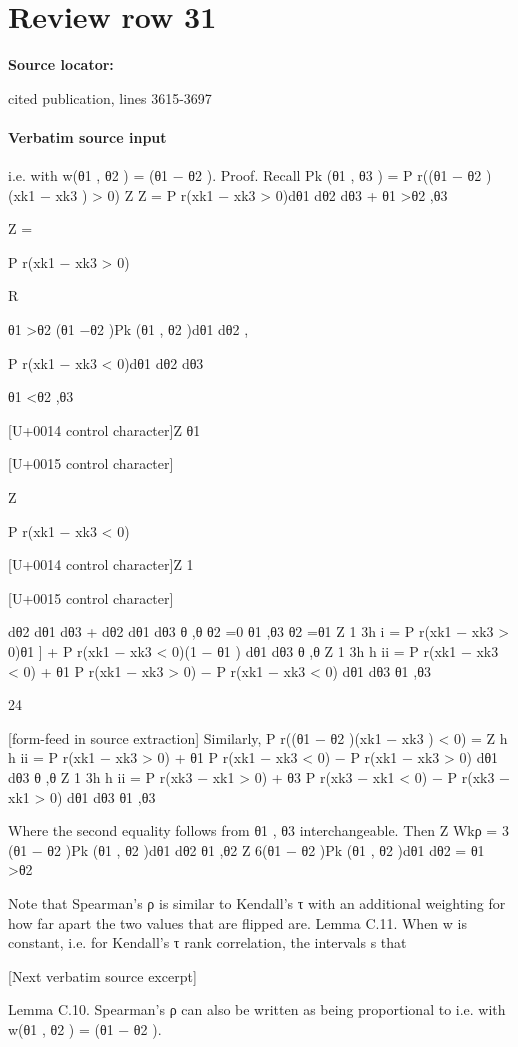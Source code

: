 \documentclass[10pt]{article}
\begin{document}
\section*{Review row 31}
\textbf{Source locator:} {\footnotesize\raggedright cited publication, lines 3615-\allowbreak{}3697\par}
\paragraph{Verbatim source input}
\begin{ReviewVerbatim}
i.e. with w(θ1 , θ2 ) = (θ1 − θ2 ).
Proof. Recall Pk (θ1 , θ3 ) =
P r((θ1 − θ2 )(xk1 − xk3 ) > 0)
Z
Z
=
P r(xk1 − xk3 > 0)dθ1 dθ2 dθ3 +
θ1 >θ2 ,θ3

Z
=

P r(xk1 − xk3 > 0)

R

θ1 >θ2 (θ1 −θ2 )Pk (θ1 , θ2 )dθ1 dθ2 ,

P r(xk1 − xk3 < 0)dθ1 dθ2 dθ3

θ1 <θ2 ,θ3

[U+0014 control character]Z θ1

[U+0015 control character]

Z

P r(xk1 − xk3 < 0)

[U+0014 control character]Z 1

[U+0015 control character]

dθ2 dθ1 dθ3 +
dθ2 dθ1 dθ3
θ ,θ
θ2 =0
θ1 ,θ3
θ2 =θ1
Z 1 3h
i
=
P r(xk1 − xk3 > 0)θ1 ] + P r(xk1 − xk3 < 0)(1 − θ1 ) dθ1 dθ3
θ ,θ
Z 1 3h
h
ii
=
P r(xk1 − xk3 < 0) + θ1 P r(xk1 − xk3 > 0) − P r(xk1 − xk3 < 0) dθ1 dθ3
θ1 ,θ3

24


[form-feed in source extraction]
Similarly,
P r((θ1 − θ2 )(xk1 − xk3 ) < 0) =
Z
h
h
ii
=
P r(xk1 − xk3 > 0) + θ1 P r(xk1 − xk3 < 0) − P r(xk1 − xk3 > 0) dθ1 dθ3
θ ,θ
Z 1 3h
h
ii
=
P r(xk3 − xk1 > 0) + θ3 P r(xk3 − xk1 < 0) − P r(xk3 − xk1 > 0) dθ1 dθ3
θ1 ,θ3

Where the second equality follows from θ1 , θ3 interchangeable. Then
Z
Wkρ = 3
(θ1 − θ2 )Pk (θ1 , θ2 )dθ1 dθ2
θ1 ,θ2
Z
6(θ1 − θ2 )Pk (θ1 , θ2 )dθ1 dθ2
=
θ1 >θ2

Note that Spearman’s ρ is similar to Kendall’s τ with an additional weighting for how far apart
the two values that are flipped are.
Lemma C.11. When w is constant, i.e. for Kendall’s τ rank correlation, the intervals s that

[Next verbatim source excerpt]

Lemma C.10. Spearman’s ρ can also be written as being proportional to
i.e. with w(θ1 , θ2 ) = (θ1 − θ2 ).
\end{ReviewVerbatim}
\end{document}
